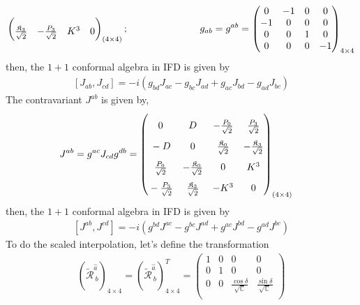 \documentclass[]{article}
\numberwithin{equation}{section}
\begin{document}
{{\begin{align}
\begin{pmatrix}
    \rule{0pt}{16pt} \frac{\mathfrak{K}_{{3}}}{\sqrt{2}}&-\frac{P_{{3}}}{\sqrt{2}}&K^3  & 0
  \end{pmatrix}_{(4\times4)};~~~~~~~~~~~~~~~~~~~~~~g_{{a}{b}}=g^{{a}{b}}=\begin{pmatrix}
  0&-1&0&0\\
  -1&0&0&0\\
  0&0&1&0\\
  0&0&0&-1\\
  \end{pmatrix}_{4\times4}
\end{align}
then, the $1+1$ conformal algebra in IFD is given by
  \begin{align}
      \left[J_{{{a}}{{b}}},J_{{{c}}{{d}}}\right]=-i\left(g_{{{b}}{{d}}}J_{{{a}}{{c}}}-g_{{{b}}{{c}}}J_{{{a}}{{d}}}+g_{{{a}}{{c}}}J_{{{b}}{{d}}}-g_{{{a}}{{d}}}J_{{{b}}{{c}}}\right)\label{AM_algebra}
  \end{align}
The contravariant $J^{ab}$ is given by,
\begin{align}
    J^{ab}&=g^{ac}J_{cd}g^{db}=\begin{pmatrix}
    \rule{0pt}{16pt} 0&D&-\frac{P_{{0}}}{\sqrt{2}}&\frac{P_{{3}}}{\sqrt{2}}\\
    \rule{0pt}{16pt} -D&0&\frac{\mathfrak{K}_{{0}}}{\sqrt{2}}&-\frac{\mathfrak{K}_{{3}}}{\sqrt{2}}\\
    \rule{0pt}{16pt} \frac{P_{{0}}}{\sqrt{2}}&-\frac{\mathfrak{K}_{{0}}}{\sqrt{2}}&0  & K^3\\
    \rule{0pt}{16pt} -\frac{P_{{3}}}{\sqrt{2}}&\frac{\mathfrak{K}_{{3}}}{\sqrt{2}}&-K^3  & 0
  \end{pmatrix}_{(4\times4)}
\end{align}
then, the $1+1$ conformal algebra in IFD is given by
  \begin{align}
      \left[J^{{{a}}{{b}}},J^{{{c}}{{d}}}\right]=-i\left(g^{{{b}}{{d}}}J^{{{a}}{{c}}}-g^{{{b}}{{c}}}J^{{{a}}{{d}}}+g^{{{a}}{{c}}}J^{{{b}}{{d}}}-g^{{{a}}{{d}}}J^{{{b}}{{c}}}\right)\label{AM_algebra}
  \end{align}
To do the scaled interpolation, let's define the transformation 
\begin{align}
    (\tilde{\mathcal{R}}^{\hat{a}}_{~b})_{4\times4}=(\tilde{\mathcal{R}}^{\hat{a}}_{~b})^T_{4\times4}=\begin{pmatrix}
    1&0&0&0\\
    0&1&0&0\\
    0&0&\frac{\cos{\delta}}{\sqrt{\mathbb{C}}}&\frac{\sin{\delta}}{\sqrt{\mathbb{C}}}\\

\end{pmatrix}
\end{align}}}
\end{document}
